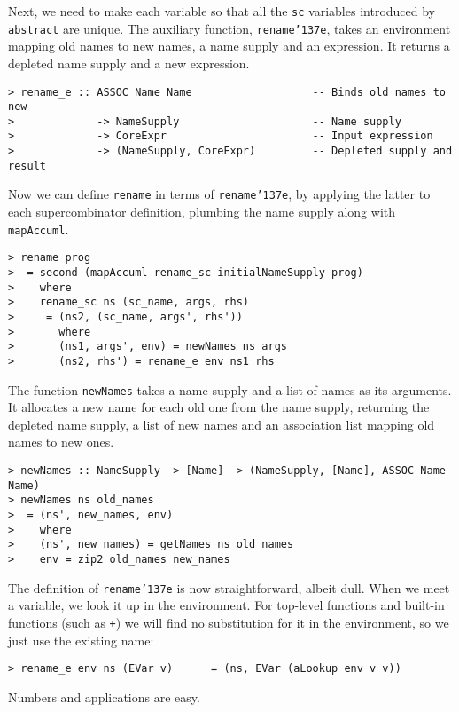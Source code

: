 Next, we need to make each variable so that all the \mbox{\tt sc} variables
introduced by \mbox{\tt abstract} are unique.  The auxiliary function,
\mbox{\tt rename{\char'137}e}, takes an environment mapping old names to new names, a
name supply and an expression.  It returns a depleted name supply and
a new expression.
\begin{verbatim}
> rename_e :: ASSOC Name Name                   -- Binds old names to new
>             -> NameSupply                     -- Name supply
>             -> CoreExpr                       -- Input expression
>             -> (NameSupply, CoreExpr)         -- Depleted supply and result
\end{verbatim}
Now we can define \mbox{\tt rename} in terms of \mbox{\tt rename{\char'137}e}, by applying the latter
to each supercombinator definition, plumbing the name supply along with
\mbox{\tt mapAccuml}.
\begin{verbatim}
> rename prog
>  = second (mapAccuml rename_sc initialNameSupply prog)
>    where
>    rename_sc ns (sc_name, args, rhs)
>     = (ns2, (sc_name, args', rhs'))
>       where
>       (ns1, args', env) = newNames ns args
>       (ns2, rhs') = rename_e env ns1 rhs
\end{verbatim}
%
\par
The function \mbox{\tt newNames} takes a name supply and a list of names as its
arguments.  It allocates a new name for each old one from the name supply,
returning the depleted name supply, a list of new names and an association
list mapping old names to new ones.
\begin{verbatim}
> newNames :: NameSupply -> [Name] -> (NameSupply, [Name], ASSOC Name Name)
> newNames ns old_names
>  = (ns', new_names, env)
>    where
>    (ns', new_names) = getNames ns old_names
>    env = zip2 old_names new_names
\end{verbatim}
%
%
The definition of \mbox{\tt rename{\char'137}e} is now straightforward, albeit dull.
When we meet a variable, we look it up in the environment.  For top-level
functions and built-in functions (such as \mbox{\tt +}) we will find no substitution
for it in the environment, so we just use the existing name:
\begin{verbatim}
> rename_e env ns (EVar v)      = (ns, EVar (aLookup env v v))
\end{verbatim}
\par
Numbers and applications are easy.
